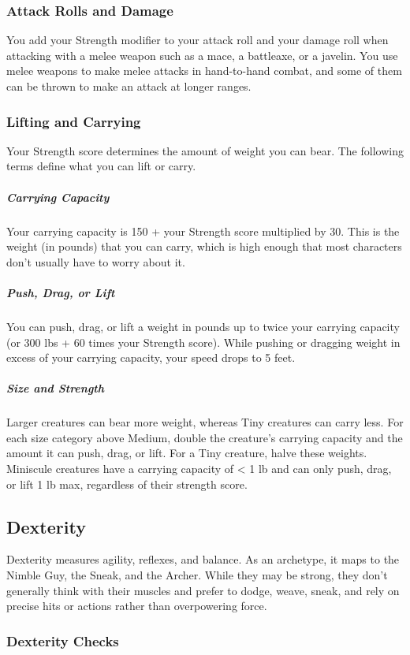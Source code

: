 \subsubsection{Attack Rolls and Damage}

You add your Strength modifier to your attack roll and your damage roll when attacking with a melee weapon such as a mace, a battleaxe, or a javelin. You use melee weapons to make melee attacks in hand-to-hand combat, and some of them can be thrown to make an attack at longer ranges.

\subsubsection{Lifting and Carrying}

Your Strength score determines the amount of weight you can bear. The following terms define what you can lift or carry.

\subparagraph*{Carrying Capacity} Your carrying capacity is 150 + your Strength score multiplied by 30. This is the weight (in pounds) that you can carry, which is high enough that most characters don't usually have to worry about it.

\subparagraph*{Push, Drag, or Lift} You can push, drag, or lift a weight in pounds up to twice your carrying capacity (or 300 lbs + 60 times your Strength score). While pushing or dragging weight in excess of your carrying capacity, your speed drops to 5 feet.

\subparagraph*{Size and Strength} Larger creatures can bear more weight, whereas Tiny creatures can carry less. For each size category above Medium, double the creature's carrying capacity and the amount it can push, drag, or lift. For a Tiny creature, halve these weights. Miniscule creatures have a carrying capacity of < 1 lb and can only push, drag, or lift 1 lb max, regardless of their strength score.

\subsection{Dexterity}

Dexterity measures agility, reflexes, and balance. As an archetype, it maps to the Nimble Guy, the Sneak, and the Archer. While they may be strong, they don't generally think with their muscles and prefer to dodge, weave, sneak, and rely on precise hits or actions rather than overpowering force.

\subsubsection{Dexterity Checks}

